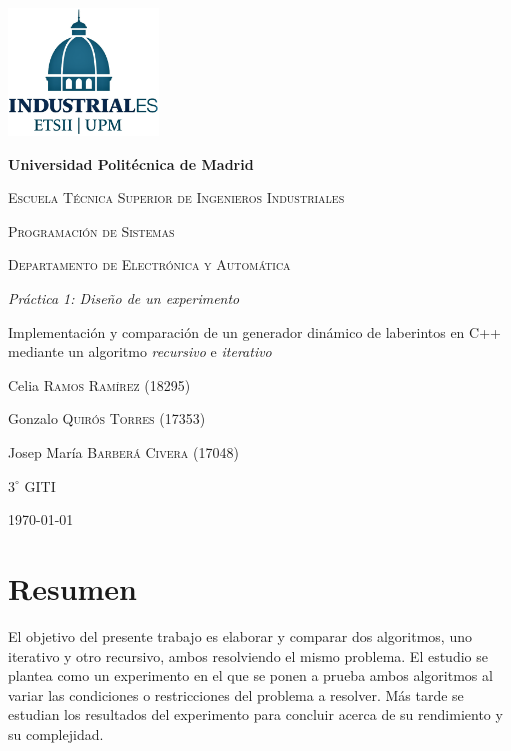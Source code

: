 \documentclass[12pt,a4paper]{article}
\newcommand{\grad}{^{\circ}}
\begin{document}
	\begin{titlepage}
	\centering
    {\includegraphics[width=0.3\textwidth]{fotos/Logo_azul.png}\par}
	\vspace{1cm}
	{\bfseries\LARGE Universidad Politécnica de Madrid \par}
	\vspace{1cm}
	{\scshape\Large Escuela Técnica Superior de Ingenieros Industriales \par}
	\vspace{2.5cm}
	{\scshape\Huge Programación de Sistemas \par}
	\vspace{0.5cm}
	{\scshape\large Departamento de Electrónica y Automática \par}
	\vspace{2cm}
    {\itshape\LARGE Práctica 1: Diseño de un experimento \par}
    \vspace{0.5cm}
    {\upshape\large Implementación y comparación de un generador dinámico de laberintos en C++ mediante un algoritmo \textit{recursivo} e \textit{iterativo}}
	\vfill
	{\large{Celia \textsc{Ramos Ramírez} (18295)\par}}
	\vspace{0.1cm}
    {\large{Gonzalo \textsc{Quirós Torres} (17353)\par}}
	\vspace{0.1cm}
	{\large{Josep María \textsc{Barberá Civera} (17048)\par}}
	\vfill
	{\Large{ $3\grad$ \textsc{GITI}}\par}
	\vfill
	{\Large \today \par}
	\end{titlepage}
	

\section*{Resumen}
El objetivo del presente trabajo es elaborar y comparar dos algoritmos, uno iterativo y otro recursivo, ambos resolviendo el mismo problema. El estudio se plantea como un experimento en el que se ponen a prueba ambos algoritmos al variar las condiciones o restricciones del problema a resolver. Más tarde se estudian los resultados del experimento para concluir acerca de su rendimiento y su complejidad.
\end{document}
